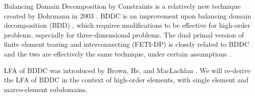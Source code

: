 Balancing Domain Decomposition by Constraints is a relatively new technique created by Dohrmann in 2003 \cite{dohrmann2003preconditioner}.
BDDC is an improvement upon balancing domain decomposition (BDD) \cite{mandel1993balancing}, which requires modifications to be effective for high-order problems, especially for three-dimensional problems.
The dual primal version of finite element tearing and interconnecting (FETI-DP) \cite{farhat2000scalable} is closely related to BDDC and the two are effectively the same technique, under certain assumptions \cite{mandel2007bddc}.

LFA of BDDC was introduced by Brown, He, and MacLachlan \cite{brown2019local}.
We will re-derive the LFA of BDDC in the context of high-order elements, with single element and marco-element subdomains.



